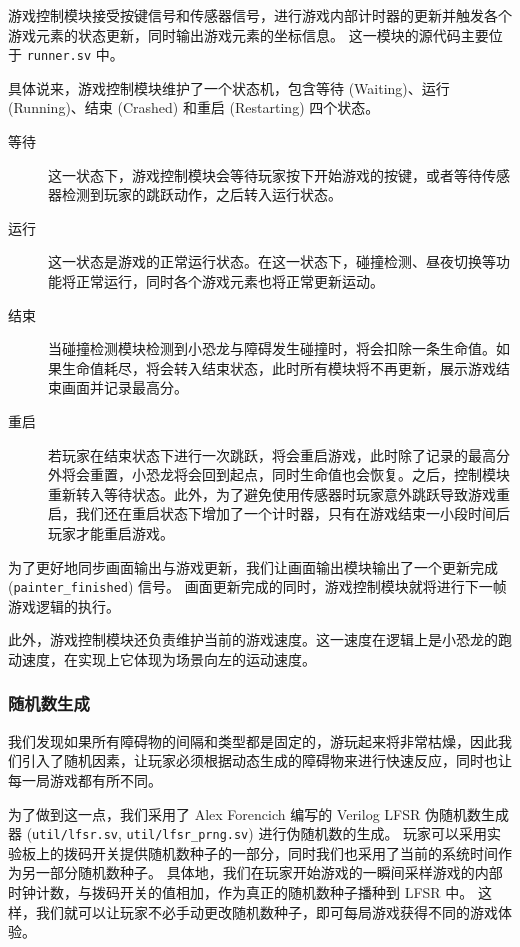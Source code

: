\documentclass[UTF8, 11pt, fontset=none]{ctexart}
\begin{document}
游戏控制模块接受按键信号和传感器信号，进行游戏内部计时器的更新并触发各个游戏元素的状态更新，同时输出游戏元素的坐标信息。
这一模块的源代码主要位于 \texttt{runner.sv} 中。

具体说来，游戏控制模块维护了一个状态机，包含等待 (Waiting)、运行 (Running)、结束 (Crashed) 和重启 (Restarting) 四个状态。
\begin{description}
    \item[等待] 这一状态下，游戏控制模块会等待玩家按下开始游戏的按键，或者等待传感器检测到玩家的跳跃动作，之后转入运行状态。
    \item[运行] 这一状态是游戏的正常运行状态。在这一状态下，碰撞检测、昼夜切换等功能将正常运行，同时各个游戏元素也将正常更新运动。
    \item[结束] 当碰撞检测模块检测到小恐龙与障碍发生碰撞时，将会扣除一条生命值。如果生命值耗尽，将会转入结束状态，此时所有模块将不再更新，展示游戏结束画面并记录最高分。
    \item[重启] 若玩家在结束状态下进行一次跳跃，将会重启游戏，此时除了记录的最高分外将会重置，小恐龙将会回到起点，同时生命值也会恢复。之后，控制模块重新转入等待状态。此外，为了避免使用传感器时玩家意外跳跃导致游戏重启，我们还在重启状态下增加了一个计时器，只有在游戏结束一小段时间后玩家才能重启游戏。
\end{description}

为了更好地同步画面输出与游戏更新，我们让画面输出模块输出了一个更新完成 (\texttt{painter_finished}) 信号。
画面更新完成的同时，游戏控制模块就将进行下一帧游戏逻辑的执行。

此外，游戏控制模块还负责维护当前的游戏速度。这一速度在逻辑上是小恐龙的跑动速度，在实现上它体现为场景向左的运动速度。

\subsubsection{随机数生成}

我们发现如果所有障碍物的间隔和类型都是固定的，游玩起来将非常枯燥，因此我们引入了随机因素，让玩家必须根据动态生成的障碍物来进行快速反应，同时也让每一局游戏都有所不同。

为了做到这一点，我们采用了 Alex Forencich 编写的 Verilog LFSR 伪随机数生成器 (\texttt{util/lfsr.sv}, \texttt{util/lfsr_prng.sv}) 进行伪随机数的生成。
玩家可以采用实验板上的拨码开关提供随机数种子的一部分，同时我们也采用了当前的系统时间作为另一部分随机数种子。
具体地，我们在玩家开始游戏的一瞬间采样游戏的内部时钟计数，与拨码开关的值相加，作为真正的随机数种子播种到 LFSR 中。
这样，我们就可以让玩家不必手动更改随机数种子，即可每局游戏获得不同的游戏体验。
\end{document}
